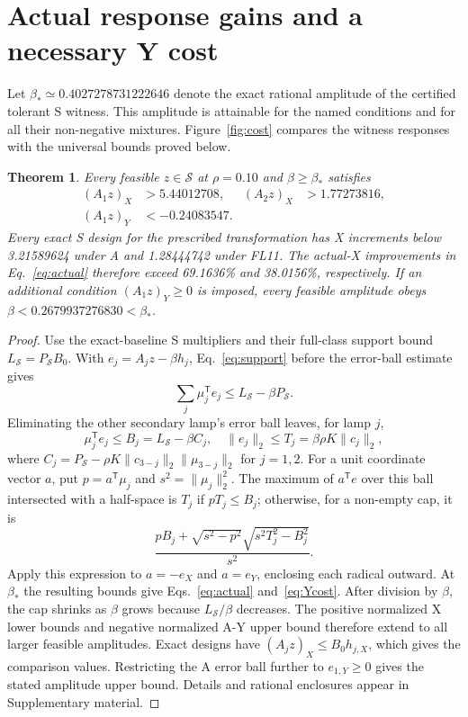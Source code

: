 \documentclass{optica-article}
\newtheorem{theorem}{Theorem}
\begin{document}
\section{Actual response gains and a necessary Y cost}
Let $\beta_*\simeq0.4027278731222646$ denote the exact rational amplitude of the certified tolerant S witness. This amplitude is attainable for the named conditions and for all their non-negative mixtures. Figure~\ref{fig:cost} compares the witness responses with the universal bounds proved below.

\begin{theorem}\label{thm:response}
Every feasible $z\in\mathcal S$ at $\rho=0.10$ and $\beta\geq\beta_*$ satisfies
\begin{align}
 (A_1z)_X&>5.44012708, & (A_2z)_X&>1.77273816,\label{eq:actual}\\
 (A_1z)_Y&<-0.24083547.\label{eq:Ycost}
\end{align}
Every exact S design for the prescribed transformation has X increments below 3.21589624 under A and 1.28444742 under FL11. The actual-X improvements in Eq.~\eqref{eq:actual} therefore exceed 69.1636\% and 38.0156\%, respectively. If an additional condition $(A_1z)_Y\geq0$ is imposed, every feasible amplitude obeys $\beta<0.2679937276830<\beta_*$.
\end{theorem}

\begin{proof}
Use the exact-baseline S multipliers and their full-class support bound $L_{\mathcal S}=P_{\mathcal S}B_0$. With $e_j=A_jz-\beta h_j$, Eq.~\eqref{eq:support} before the error-ball estimate gives
\begin{equation}
 \sum_j\mu_j^{\mathsf T}e_j\leq L_{\mathcal S}-\beta P_{\mathcal S}.
\end{equation}
Eliminating the other secondary lamp's error ball leaves, for lamp $j$,
\begin{equation}
 \mu_j^{\mathsf T}e_j\leq B_j=L_{\mathcal S}-\beta C_j,
 \quad\|e_j\|_2\leq T_j=\beta\rho K\|c_j\|_2,
 \label{eq:cap}
\end{equation}
where $C_j=P_{\mathcal S}-\rho K\|c_{3-j}\|_2\|\mu_{3-j}\|_2$ for $j=1,2$. For a unit coordinate vector $a$, put $p=a^{\mathsf T}\mu_j$ and $s^2=\|\mu_j\|_2^2$. The maximum of $a^{\mathsf T}e$ over this ball intersected with a half-space is $T_j$ if $pT_j\leq B_j$; otherwise, for a non-empty cap, it is
\begin{equation}
 \frac{pB_j+\sqrt{s^2-p^2}\sqrt{s^2T_j^2-B_j^2}}{s^2}.
 \label{eq:capformula}
\end{equation}
Apply this expression to $a=-e_X$ and $a=e_Y$, enclosing each radical outward. At $\beta_*$ the resulting bounds give Eqs.~\eqref{eq:actual} and~\eqref{eq:Ycost}. After division by $\beta$, the cap shrinks as $\beta$ grows because $L_{\mathcal S}/\beta$ decreases. The positive normalized X lower bounds and negative normalized A-Y upper bound therefore extend to all larger feasible amplitudes. Exact designs have $(A_jz)_X\leq B_0h_{j,X}$, which gives the comparison values. Restricting the A error ball further to $e_{1,Y}\geq0$ gives the stated amplitude upper bound. Details and rational enclosures appear in Supplementary material.
\end{proof}
\end{document}
